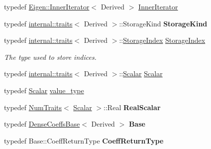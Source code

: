 \begin{DoxyCompactItemize}
typedef \mbox{\hyperlink{class_eigen_1_1_inner_iterator}{Eigen\+::\+Inner\+Iterator}}$<$ Derived $>$ \mbox{\hyperlink{class_eigen_1_1_dense_base_a4dc102b445d8fb48a28dfcd22323f649}{Inner\+Iterator}}
\item 
\mbox{\label{class_eigen_1_1_dense_base_a3b9ef013d71b5b625b50de1e42a9ef29}} 
typedef \mbox{\hyperlink{struct_eigen_1_1internal_1_1traits}{internal\+::traits}}$<$ Derived $>$\+::Storage\+Kind {\bfseries Storage\+Kind}
\item 
typedef \mbox{\hyperlink{struct_eigen_1_1internal_1_1traits}{internal\+::traits}}$<$ Derived $>$\+::\mbox{\hyperlink{class_eigen_1_1_dense_base_a2d1aba3f6c414715d830f760913c7e00}{Storage\+Index}} \mbox{\hyperlink{class_eigen_1_1_dense_base_a2d1aba3f6c414715d830f760913c7e00}{Storage\+Index}}
\begin{DoxyCompactList}\small\item\em The type used to store indices. \end{DoxyCompactList}\item 
typedef \mbox{\hyperlink{struct_eigen_1_1internal_1_1traits}{internal\+::traits}}$<$ Derived $>$\+::\mbox{\hyperlink{class_eigen_1_1_dense_base_a5feed465b3a8e60c47e73ecce83e39a2}{Scalar}} \mbox{\hyperlink{class_eigen_1_1_dense_base_a5feed465b3a8e60c47e73ecce83e39a2}{Scalar}}
\item 
typedef \mbox{\hyperlink{class_eigen_1_1_dense_base_a5feed465b3a8e60c47e73ecce83e39a2}{Scalar}} \mbox{\hyperlink{class_eigen_1_1_dense_base_a9276182dab8236c33f1e7abf491d504d}{value\+\_\+type}}
\item 
\mbox{\label{class_eigen_1_1_dense_base_a25c2ae37392d553e4a75928c5d864470}} 
typedef \mbox{\hyperlink{struct_eigen_1_1_num_traits}{Num\+Traits}}$<$ \mbox{\hyperlink{class_eigen_1_1_dense_base_a5feed465b3a8e60c47e73ecce83e39a2}{Scalar}} $>$\+::Real {\bfseries Real\+Scalar}
\item 
\mbox{\label{class_eigen_1_1_dense_base_a92b410d073ded19e12e17c4ee4d37eaa}} 
typedef \mbox{\hyperlink{class_eigen_1_1_dense_coeffs_base}{Dense\+Coeffs\+Base}}$<$ Derived $>$ {\bfseries Base}
\item 
\mbox{\label{class_eigen_1_1_dense_base_a48f980a04d61aca7e664c301171bde5d}} 
typedef Base\+::\+Coeff\+Return\+Type {\bfseries Coeff\+Return\+Type}

\end{DoxyCompactItemize}
